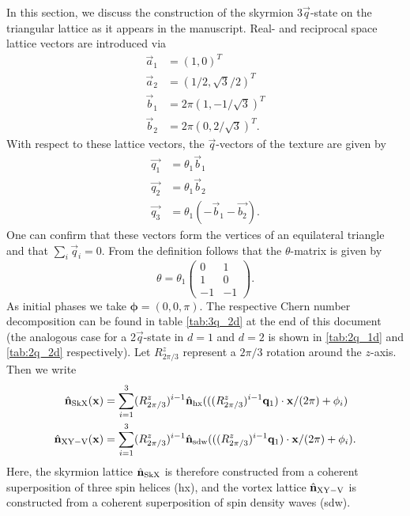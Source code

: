 \documentclass[
    aps,
    prb,
    twocolumn,
    floatfix,
    superscriptaddress,
	10pt
]{revtex4-2}
\begin{document}
In this section, we discuss the construction of the skyrmion $3\vec{q}$-state on the triangular lattice as it appears in the manuscript.
Real- and reciprocal space lattice vectors are introduced via
\begin{align}
	\vec{a}_1 &= (1,0)^T
	\\
	\vec{a}_2 &= (1/2,\sqrt{3}/2 )^T
	\\
	\vec{b}_1 &= 2 \pi (1, -1/\sqrt{3})^T
	\\
	\vec{b}_2 &= 2 \pi (0, 2 / \sqrt{3})^T .
\end{align}
With respect to these lattice vectors, the $\vec{q}$-vectors of the texture are given by
\begin{align}
	\vec{q_1} &= \theta_1 \vec{b}_1 \\
	\vec{q_2} &= \theta_1\vec{b}_2\\
	\vec{q_3} &= \theta_1(-\vec{b}_1- \vec{b_2}) .
\end{align}
One can confirm that these vectors form the vertices of an equilateral triangle and that $\sum_i \vec{q}_i = 0$.
From the definition follows that the $\theta$-matrix is given by
\begin{equation}
	\theta =
	\theta_1 
	\begin{pmatrix}
		0 & 1 \\
		1 & 0 \\
		-1 & -1
	\end{pmatrix} .
\end{equation}
As initial phases we take $\boldsymbol{\phi} = (0,0,\pi)$.  
The respective Chern number decomposition can be found in table \ref{tab:3q_2d} at the end of this document (the analogous case for a 2$\vec{q}$-state in $d=1$ and $d=2$ is shown in \ref{tab:2q_1d} and  \ref{tab:2q_2d} respectively).
Let $R^z_{2\pi/3}$ represent a $2\pi/3$ rotation around the $z$-axis.
Then we write
\begin{align}
	\hat{\mathbf{n}}_\mathrm{SkX}(\mathbf{x}) &=  \sum_{i=1}^{3 } (R^z_{2\pi/3})^{i-1} \hat{\mathbf{n}}_\mathrm{hx} ( ((R^z_{2\pi/3})^{i-1} \mathbf{q}_1 )\cdot \mathbf{x}/ (2\pi) + \phi_i ) 
	\\
	\hat{\mathbf{n}}_\mathrm{XY-V}(\mathbf{x}) &= \sum_{i=1}^{3 } (R^z_{2\pi/3})^{i-1} \hat{\mathbf{n}}_\mathrm{sdw} ( ((R^z_{2\pi/3})^{i-1} \mathbf{q}_1 )\cdot \mathbf{x}/ (2\pi)  + \phi_i ) .
\end{align}
Here, the skyrmion lattice $\hat{\mathbf{n}}_\mathrm{SkX}$ is therefore constructed from a coherent superposition of three spin helices (hx), and the vortex lattice $\hat{\mathbf{n}}_\mathrm{XY-V}$ is constructed  from a coherent superposition of spin density waves (sdw).
\end{document}
